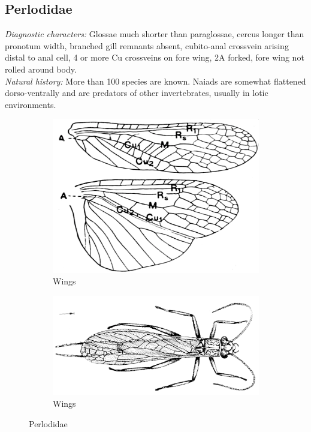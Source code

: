 \documentclass[letterpaper, 11pt]{article}
\begin{document}
\subsection{Perlodidae}
\noindent{}\textit{Diagnostic characters:} Glossae much shorter than paraglossae, cercus longer than pronotum width, branched gill remnants absent, cubito-anal crossvein arising distal to anal cell, 4 or more Cu crossveins on fore wing, 2A forked, fore wing not rolled around body.\\

\noindent{}\textit{Natural history:} More than 100 species are known. Naiads are somewhat flattened dorso-ventrally and are predators of other invertebrates, usually in lotic environments.\\

\begin{figure}[ht!]
    \centering
    \begin{subfigure}[ht!]{0.4\textwidth}
        \includegraphics[width=\textwidth]{PerlodidWings}
        \caption{Wings \citep[modified from][Plate 9, Fig. 1]{bhl29875}}
        \label{fig:perlodid1}
    \end{subfigure}
    \qquad
    \begin{subfigure}[ht!]{0.5\textwidth}
        \includegraphics[width=\textwidth]{PerlodidHabitus}
        \caption{Wings \citep[modified from][Fig. 12]{bhl29875}}
        \label{fig:perlodid2}
    \end{subfigure}
    \caption{Perlodidae}\label{fig:perlodids}
\end{figure}
\end{document}
